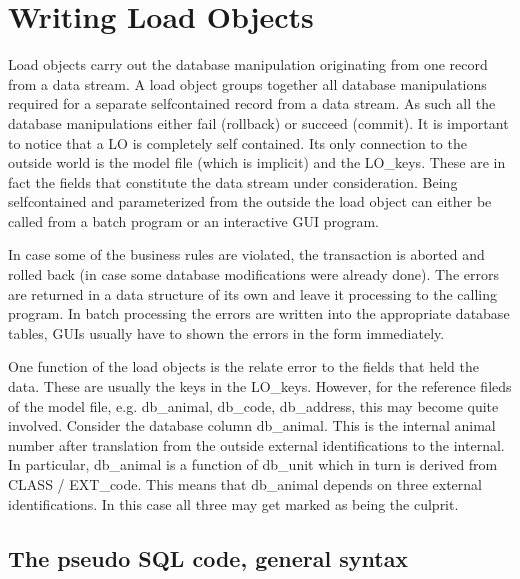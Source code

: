 \chapter{Writing Load Objects}

Load objects carry out the database manipulation originating from
one record from a data stream. A load object groups together all database
manipulations required for a separate selfcontained record from a
data stream. As such all the database manipulations either fail (rollback)
or succeed (commit). It is important to notice that
a LO is completely self contained. Its only connection to the outside
world is the model file (which is implicit) and the LO\_keys. These
are in fact the fields that constitute the data stream under consideration.
Being selfcontained and parameterized from the outside the load object
can either be called from a batch program
or an interactive GUI program. 

In case some of the business rules are violated, the transaction is
aborted and rolled back (in case some database modifications were
already done). The errors are returned in a data structure of its
own and leave it processing to the calling program. In batch processing
the errors are written into the appropriate database tables, GUIs
usually have to shown the errors in the form immediately.

One function of the load objects is the relate error to the fields
that held the data. These are usually the keys in the LO\_keys. However,
for the reference fileds of the model file, e.g. db\_animal, db\_code, db\_address, this may
become quite involved. Consider the database column db\_animal. This
is the internal animal number after translation from the outside external
identifications to the internal. In particular, db\_animal is a function
of db\_unit which in turn is derived from CLASS / EXT\_code. This
means that db\_animal depends on three external identifications. In
this case all three may get marked as being the culprit.


\section{The pseudo SQL code, general syntax}

